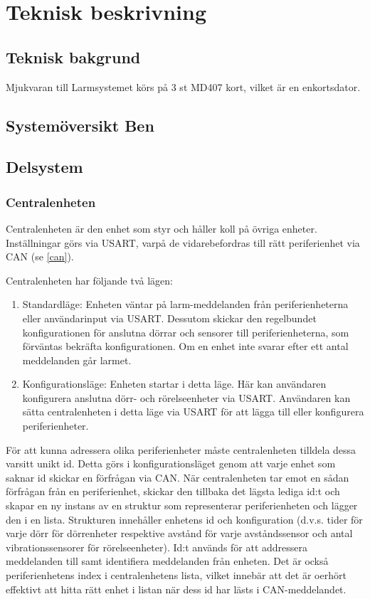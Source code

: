 \documentclass{article}
\begin{document}
\section{Teknisk beskrivning} %
\subsection{Teknisk bakgrund}
Mjukvaran till Larmsystemet körs på 3 st MD407 kort, vilket är en 
enkortsdator.
\subsection{Systemöversikt Ben}
\subsection{Delsystem }
\subsubsection{Centralenheten}
Centralenheten är den enhet som styr och håller koll på övriga enheter.
 Inställningar görs via USART, varpå de vidarebefordras till rätt
  periferienhet via CAN (se \ref{can}). 

Centralenheten har följande två lägen:

\begin{enumerate}
    \item Standardläge: Enheten väntar på larm-meddelanden från 
    periferienheterna eller användarinput via USART. Dessutom 
    skickar den regelbundet  konfigurationen för anslutna 
    dörrar och sensorer till periferienheterna, som förväntas 
    bekräfta konfigurationen. Om en enhet inte svarar efter 
    ett antal meddelanden går larmet.
    \item Konfigurationsläge: Enheten startar i detta läge.
     Här kan användaren konfigurera anslutna dörr- och 
     rörelseenheter via USART. Användaren kan sätta centralenheten
      i detta läge via USART för att lägga till eller konfigurera
       periferienheter.
\end{enumerate}

För att kunna adressera olika periferienheter måste centralenheten 
tilldela dessa varsitt unikt id. Detta görs i konfigurationsläget
genom att varje enhet som saknar id skickar en förfrågan via CAN.
När centralenheten tar emot en sådan förfrågan från en periferienhet, 
skickar den tillbaka det lägsta lediga id:t och skapar en ny instans
av en struktur som representerar periferienheten och lägger den i en
lista. Strukturen innehåller enhetens id och konfiguration (d.v.s.
tider för varje dörr för dörrenheter respektive avstånd för varje
avståndssensor och antal vibrationssensorer för rörelseenheter). 
Id:t används för att addressera meddelanden till samt identifiera 
meddelanden från enheten. Det är också periferienhetens index i 
centralenhetens lista, vilket innebär att det är oerhört effektivt
att hitta rätt enhet i listan när dess id har lästs i CAN-meddelandet.
\end{document}
